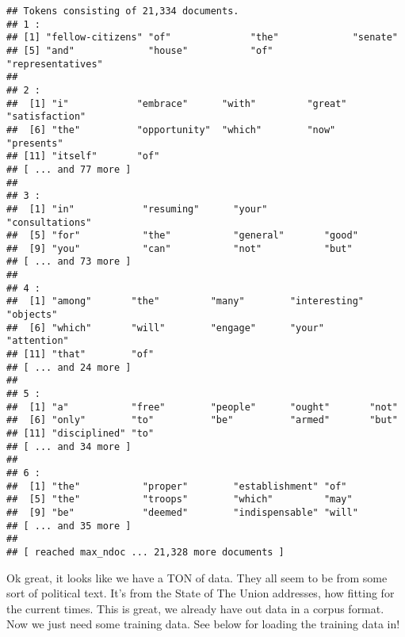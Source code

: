 \documentclass[
]{article}
\newenvironment{Shaded}{\begin{snugshade}}{\end{snugshade}}
\newcommand{\CommentTok}[1]{\textcolor[rgb]{0.56,0.35,0.01}{\textit{#1}}}
\newcommand{\DataTypeTok}[1]{\textcolor[rgb]{0.13,0.29,0.53}{#1}}
\newcommand{\DecValTok}[1]{\textcolor[rgb]{0.00,0.00,0.81}{#1}}
\newcommand{\KeywordTok}[1]{\textcolor[rgb]{0.13,0.29,0.53}{\textbf{#1}}}
\newcommand{\NormalTok}[1]{#1}
\newcommand{\OperatorTok}[1]{\textcolor[rgb]{0.81,0.36,0.00}{\textbf{#1}}}
\newcommand{\StringTok}[1]{\textcolor[rgb]{0.31,0.60,0.02}{#1}}
\begin{document}
\begin{verbatim}
## Tokens consisting of 21,334 documents.
## 1 :
## [1] "fellow-citizens" "of"              "the"             "senate"         
## [5] "and"             "house"           "of"              "representatives"
## 
## 2 :
##  [1] "i"            "embrace"      "with"         "great"        "satisfaction"
##  [6] "the"          "opportunity"  "which"        "now"          "presents"    
## [11] "itself"       "of"          
## [ ... and 77 more ]
## 
## 3 :
##  [1] "in"            "resuming"      "your"          "consultations"
##  [5] "for"           "the"           "general"       "good"         
##  [9] "you"           "can"           "not"           "but"          
## [ ... and 73 more ]
## 
## 4 :
##  [1] "among"       "the"         "many"        "interesting" "objects"    
##  [6] "which"       "will"        "engage"      "your"        "attention"  
## [11] "that"        "of"         
## [ ... and 24 more ]
## 
## 5 :
##  [1] "a"           "free"        "people"      "ought"       "not"        
##  [6] "only"        "to"          "be"          "armed"       "but"        
## [11] "disciplined" "to"         
## [ ... and 34 more ]
## 
## 6 :
##  [1] "the"           "proper"        "establishment" "of"           
##  [5] "the"           "troops"        "which"         "may"          
##  [9] "be"            "deemed"        "indispensable" "will"         
## [ ... and 35 more ]
## 
## [ reached max_ndoc ... 21,328 more documents ]
\end{verbatim}

Ok great, it looks like we have a TON of data. They all seem to be from
some sort of political text. It's from the State of The Union addresses,
how fitting for the current times. This is great, we already have out
data in a corpus format. Now we just need some training data. See below
for loading the training data in!

\begin{Shaded}
\end{Shaded}
\end{document}
